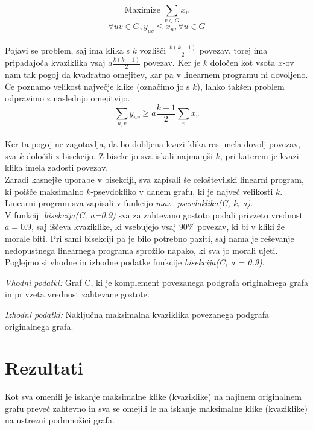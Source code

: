 \documentclass[12pt,a4paper]{amsart}
\theoremstyle{definition}
\theoremstyle{plain}
\begin{document}
\begin{itemize}
 $$\text{Maximize }\sum_{v\in G}x_v$$ $$\forall uv \in G,  y_{uv} \leqslant x_u, \forall u \in G$$\\
 
Pojavi se problem, saj ima klika s $k$ vozlišči $\frac{k(k-1)}{2}$ povezav, torej ima pripadajoča kvaziklika vsaj $a \frac{ k(k-1)}{2}$ povezav. Ker je $k$ določen kot vsota $x$-ov nam tak pogoj da kvadratno omejitev, kar pa v linearnem programu ni dovoljeno. Če poznamo velikost največje klike (označimo jo s $k$), lahko takšen problem odpravimo z naslednjo omejitvijo.\\
 
 $$ \sum_{u, v} y_{uv} \geqslant a   \frac{k-1}{2}  \sum_v x_v$$ \\
 
 Ker ta pogoj ne zagotavlja, da bo dobljena kvazi-klika res imela dovolj povezav, sva $k$ določili z bisekcijo. Z bisekcijo sva iskali najmanjši $k$, pri katerem je kvazi-klika imela zadosti povezav. \\

Zaradi kasnejše uporabe v bisekciji, sva zapisali še celoštevilski linearni program, ki poišče maksimalno $k$-psevdokliko v danem grafu, ki je največ velikosti $k$. Linearni program sva zapisali v funkcijo \textit{max\_psevdoklika(C, k, a)}.
 \\
V funkciji \textit{bisekcija(C, a=0.9)} sva za zahtevano gostoto podali privzeto vrednost $a = 0.9$, saj iščeva kvaziklike, ki vsebujejo vsaj $90\%$ povezav, ki bi v kliki že morale biti. Pri sami bisekciji pa je bilo potrebno paziti, saj nama je reševanje nedopustnega linearnega programa sprožilo napako, ki sva jo morali ujeti. Poglejmo si vhodne in izhodne podatke funkcije \textit{bisekcija(C, a = 0.9)}.
 
\textit{Vhodni podatki:} Graf C, ki je komplement povezanega podgrafa originalnega grafa in privzeta vrednost zahtevane gostote.

\textit{Izhodni podatki:} Naključna maksimalna kvaziklika povezanega podgrafa originalnega grafa.

\end{itemize}

\section{Rezultati}

Kot sva omenili je iskanje maksimalne klike (kvaziklike) na najinem originalnem grafu preveč zahtevno in sva se omejili le na iskanje maksimalne klike (kvaziklike) na ustrezni podmnožici grafa.\\
\end{document}
